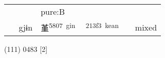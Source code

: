 \documentclass[14pt,a4paper]{scrartcl}
\begin{document}
\begin{longtable}[c]{@{}llllll@{}}
\begin{minipage}[t]{0.14\columnwidth}
\strut\end{minipage} &
\begin{minipage}[t]{0.14\columnwidth}\raggedright\strut
\strut\end{minipage} &
\begin{minipage}[t]{0.14\columnwidth}\raggedright\strut
pure:B
\strut\end{minipage}\tabularnewline
\begin{minipage}[t]{0.14\columnwidth}\raggedright\strut
𦻍
\strut\end{minipage} &
\begin{minipage}[t]{0.14\columnwidth}\raggedright\strut
gjɨn
\strut\end{minipage} &
\begin{minipage}[t]{0.14\columnwidth}\raggedright\strut
堇\textsuperscript{5807~gin}
\strut\end{minipage} &
\begin{minipage}[t]{0.14\columnwidth}\raggedright\strut
𡏳\textsuperscript{213f3~kean}
\strut\end{minipage} &
\begin{minipage}[t]{0.14\columnwidth}\raggedright\strut
\strut\end{minipage} &
\begin{minipage}[t]{0.14\columnwidth}\raggedright\strut
mixed
\strut\end{minipage}\tabularnewline
\bottomrule
\end{longtable}

(111) 0483 {[}2{]}
\end{document}
